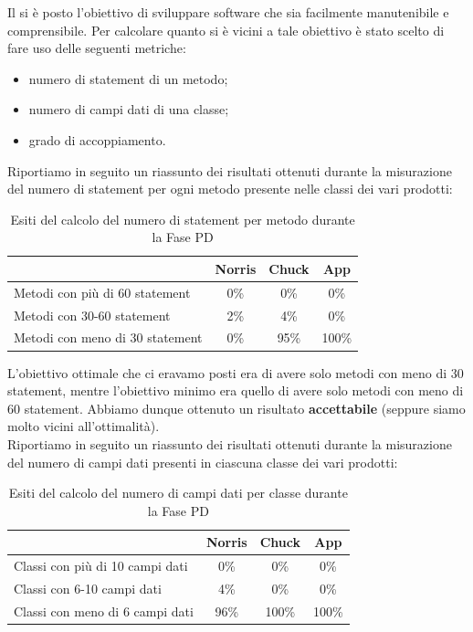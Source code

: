 			 \label{sec:manutebilitaEsitiPD}
				Il \groupname si è posto l'obiettivo di sviluppare software che sia facilmente manutenibile e comprensibile. Per calcolare quanto si è vicini a tale obiettivo è stato scelto di fare uso delle seguenti metriche:
				\begin{itemize}
					\item numero di statement di un metodo;
					\item numero di campi dati di una classe;
					\item grado di accoppiamento.
				\end{itemize}
				Riportiamo in seguito un riassunto dei risultati ottenuti durante la misurazione del numero di statement per ogni metodo presente nelle classi dei vari prodotti:
				\begin{table}[H]
					\centering
					\begin{tabu}{| l | c | c | c |}
						\hline
						                                  & Norris   & Chuck   & App     \\ \hline \hline
						Metodi con più di 60 statement    & 0\%      & 0\%     & 0\%     \\ \hline
						Metodi con 30-60 statement        & 2\%      & 4\%     & 0\%     \\ \hline
						Metodi con meno di 30 statement   & 0\%      & 95\%    & 100\%   \\ \hline
					\end{tabu}
					\caption{Esiti del calcolo del numero di statement per metodo durante la Fase PD}
				\end{table}
				L'obiettivo ottimale che ci eravamo posti era di avere solo metodi con meno di 30 statement, mentre l'obiettivo minimo era quello di avere solo metodi con meno di 60 statement. Abbiamo dunque ottenuto un risultato \textbf{accettabile} (seppure siamo molto vicini all'ottimalità).\\
				Riportiamo in seguito un riassunto dei risultati ottenuti durante la misurazione del numero di campi dati presenti in ciascuna classe dei vari prodotti:
				\begin{table}[H]
					\centering
					\begin{tabu}{| l | c | c | c |}
						\hline
						                                  & Norris   & Chuck   & App     \\ \hline \hline
						Classi con più di 10 campi dati   & 0\%      & 0\%     & 0\%     \\ \hline
						Classi con 6-10 campi dati        & 4\%      & 0\%     & 0\%     \\ \hline
						Classi con meno di 6 campi dati   & 96\%     & 100\%   & 100\%   \\ \hline
					\end{tabu}
					\caption{Esiti del calcolo del numero di campi dati per classe durante la Fase PD}
				\end{table}
